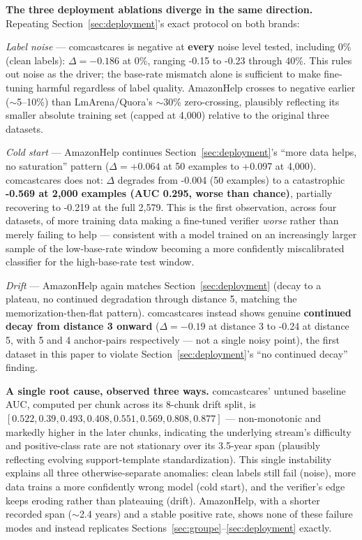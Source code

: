 \documentclass[11pt]{article}
\begin{document}
\textbf{The three deployment ablations diverge in the same direction.} Repeating Section~\ref{sec:deployment}'s exact protocol on both brands:

\emph{Label noise} --- comcastcares is negative at \textbf{every} noise level tested, including 0\% (clean labels): $\Delta = -0.186$ at 0\%, ranging -0.15 to -0.23 through 40\%. This rules out noise as the driver; the base-rate mismatch alone is sufficient to make fine-tuning harmful regardless of label quality. AmazonHelp crosses to negative earlier ($\sim$5--10\%) than LmArena/Quora's $\sim$30\% zero-crossing, plausibly reflecting its smaller absolute training set (capped at 4,000) relative to the original three datasets.

\emph{Cold start} --- AmazonHelp continues Section~\ref{sec:deployment}'s ``more data helps, no saturation'' pattern ($\Delta = +0.064$ at 50 examples to +0.097 at 4,000). comcastcares does not: $\Delta$ degrades from -0.004 (50 examples) to a catastrophic \textbf{-0.569 at 2{,}000 examples (AUC 0.295, worse than chance)}, partially recovering to -0.219 at the full 2,579. This is the first observation, across four datasets, of more training data making a fine-tuned verifier \emph{worse} rather than merely failing to help --- consistent with a model trained on an increasingly larger sample of the low-base-rate window becoming a more confidently miscalibrated classifier for the high-base-rate test window.

\emph{Drift} --- AmazonHelp again matches Section~\ref{sec:deployment} (decay to a plateau, no continued degradation through distance 5, matching the memorization-then-flat pattern). comcastcares instead shows genuine \textbf{continued decay from distance 3 onward} ($\Delta = -0.19$ at distance 3 to -0.24 at distance 5, with 5 and 4 anchor-pairs respectively --- not a single noisy point), the first dataset in this paper to violate Section~\ref{sec:deployment}'s ``no continued decay'' finding.

\textbf{A single root cause, observed three ways.} comcastcares' untuned baseline AUC, computed per chunk across its 8-chunk drift split, is $[0.522, 0.39, 0.493, 0.408, 0.551, 0.569, 0.808, 0.877]$ --- non-monotonic and markedly higher in the later chunks, indicating the underlying stream's difficulty and positive-class rate are not stationary over its 3.5-year span (plausibly reflecting evolving support-template standardization). This single instability explains all three otherwise-separate anomalies: clean labels still fail (noise), more data trains a more confidently wrong model (cold start), and the verifier's edge keeps eroding rather than plateauing (drift). AmazonHelp, with a shorter recorded span ($\sim$2.4 years) and a stable positive rate, shows none of these failure modes and instead replicates Sections~\ref{sec:groupe}--\ref{sec:deployment} exactly.
\end{document}
